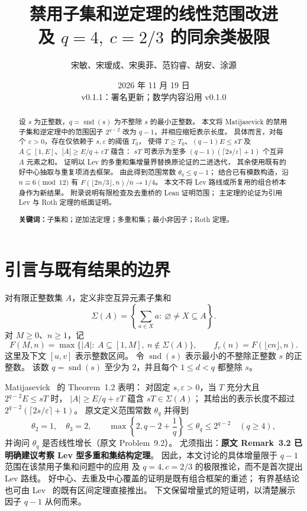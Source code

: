 \documentclass[UTF8,a4paper,11pt,fontset=none]{ctexart}
\title{\bfseries 禁用子集和逆定理的线性范围改进\\[0.3em]
\large 及 $q=4,\ c=2/3$ 的同余类极限}
\author{宋敏、宋瑷成、宋奥菲、范钧睿、胡安、涂源}
\date{2026 年 11 月 19 日\\[0.3em]\small v0.1.1：署名更新；数学内容沿用 v0.1.0}
\theoremstyle{remark}
\newcommand{\sig}{\Sigma}
\newcommand{\snd}{\operatorname{snd}}
\newcommand{\eps}{\varepsilon}
\begin{document}
\maketitle
\begin{abstract}
设 $s$ 为正整数，$q=\snd(s)$ 为不整除 $s$ 的最小正整数。
本文将 Matijasevick 的禁用子集和逆定理中的范围因子
$2^{q-2}$ 改为 $q-1$，并相应缩短表示长度。
具体而言，对每个 $\eps>0$，存在仅依赖于 $s,\eps$ 的阈值 $T_0$，
使得 $T\ge T_0$、$(q-1)E\le sT$ 及
$A\subseteq[1,E]$、$|A|\ge E/q+\eps T$ 蕴含：
$sT$ 可表示为至多 $(q-1)(\lceil2s/\eps\rceil+1)$
个互异 $A$ 元素之和。
证明以 Lev 的多重和集增量界替换原论证的二进迭代，
其余使用既有的好中心抽取与重复项消去框架。
由此得到范围常数 $\theta_q\le q-1$；
结合已有模数构造，沿 $n\equiv6\pmod{12}$ 有
$F(\lfloor2n/3\rfloor,n)/n\to1/4$。
本文不将 Lev 路线或所复用的组合桥本身作为新结果。
附录说明有限检查及去重桥的 Lean 证明范围；
主定理的论证为引用 Lev 与 Roth 定理的纸面证明。
\par\noindent\textbf{关键词：}子集和；逆加法定理；多重和集；最小非因子；Roth 定理。
\end{abstract}

\section{引言与既有结果的边界}\label{sec:intro}
对有限正整数集 $A$，定义非空互异元素子集和
\[
  \sig(A)=
  \left\{\sum_{a\in X}a:\ \varnothing\ne X\subseteq A\right\}.
\]
对 $M\ge0$、$n\ge1$，记
\[
 F(M,n)=\max\bigl\{|A|:\ A\subseteq[1,M],\ n\notin\sig(A)\bigr\},
 \qquad f_c(n)=F(\lfloor cn\rfloor,n).
\]
这里及下文 $[u,v]$ 表示整数区间。
令 $\snd(s)$ 表示最小的不整除正整数 $s$ 的正整数。
该数 $q=\snd(s)$ 至少为 $2$，并且每个 $1\le d<q$ 都整除 $s$。

Matijasevick~\cite{Matijasevick2026} 的 Theorem~1.2 表明：
对固定 $s,\eps>0$，当 $T$ 充分大且 $2^{q-2}E\le sT$ 时，
$|A|\ge E/q+\eps T$ 蕴含 $sT\in\sig(A)$；
其给出的表示长度不超过
$2^{q-2}(\lceil2s/\eps\rceil+1)$。
原文定义范围常数 $\theta_q$ 并得到
\[
  \theta_2=1,\quad \theta_3=2,\qquad
  \max\!\left\{2,q-2+\frac1q\right\}\le\theta_q\le2^{q-2}
  \quad(q\ge4),
\]
并询问 $\theta_q$ 是否线性增长（原文 Problem~9.2）。
尤须指出：\textbf{原文 Remark~3.2 已明确建议考察 Lev 型多重和集结构定理}。
因此，本文讨论的具体增量限于 $q-1$ 范围在该禁用子集和问题中的应用
及 $q=4,c=2/3$ 的极限推论，而不是首次提出 Lev 路线。
好中心、去重及中心覆盖的证明是既有组合框架的重述；
有界基结论也可由 Lev~\cite{Lev1997} 的既有区间定理直接推出。
下文保留增量式的短证明，以清楚展示因子 $q-1$ 从何而来。
\end{document}
